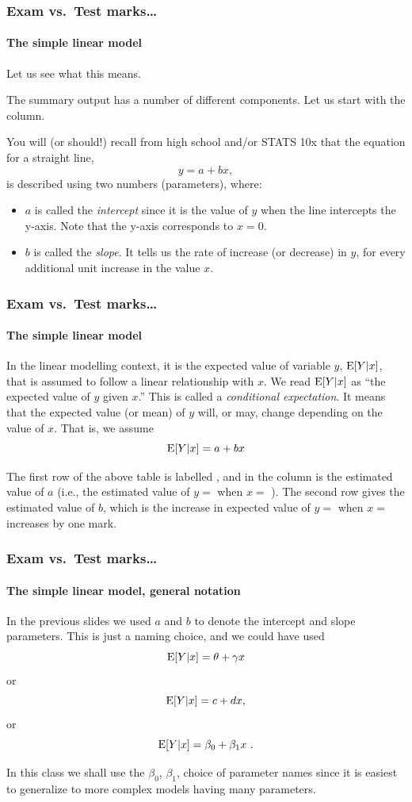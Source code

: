 \documentclass{beamer}\usepackage[]{graphicx}\usepackage[]{xcolor}
\begin{document}
\begin{frame}[fragile]
\frametitle{Exam vs.\ Test marks\ldots}
\framesubtitle{The simple linear model}
Let us see what this means.\\
\vspace{12pt}

The summary output has a number of different components.
Let us start with the  column.

You will (or should!) recall from high school and/or STATS 10x that the equation for a straight line,
\[
y=a+bx,
\]
is described using two numbers (parameters), where:\\
\begin{itemize}
\item $a$ is called the \emph{intercept} since it is the value of $y$ when the line intercepts the y-axis. Note that the y-axis corresponds to $x=0$.

\item $b$ is called the \emph{slope}. It tells us the rate of increase (or decrease) in $y$, for every additional unit increase in the value $x$.
\end{itemize}

\end{frame}



\begin{frame}[fragile]
\frametitle{Exam vs.\ Test marks\ldots}
\framesubtitle{The simple linear model}
In the linear modelling context,
it is the expected value of variable $y$, $\operatorname{E}[Y|x]$,
that is assumed to follow a linear relationship with $x$. We read $\operatorname{E}[Y|x]$ as ``the expected value of $y$ given $x$.'' This is called a \emph{conditional expectation}. It means that the expected value (or mean) of $y$ will, or may, change depending on the value of $x$.
That is, we assume
\[
\operatorname{E}[Y|x]=a+bx
\]

The first row of the above  table is labelled , and in the  column is the estimated value
of $a$ (i.e., the estimated value of $y=$  when $x=$ ). 
The second row gives the estimated value of $b$, which is the increase in expected value of $y=$  when $x=$  increases by one mark.

\end{frame}


\begin{frame}[fragile]
\frametitle{Exam vs.\ Test marks\ldots}
\framesubtitle{The simple linear model, general notation}

In the previous slides we used $a$ and $b$ to denote the intercept and slope parameters. 
This is just a naming choice, and we could have used 
\[
\operatorname{E}[Y|x]=\theta+\gamma x
\] or
\[
\operatorname{E}[Y|x]=c+dx,
\] or
\[
\operatorname{E}[Y|x]=\beta_0+\beta_{1}x \ .
\]

In this class we shall use the $\beta_0$, $\beta_1$, choice of parameter names
since it is easiest to generalize to more complex models having many parameters.

\end{frame}
\end{document}
